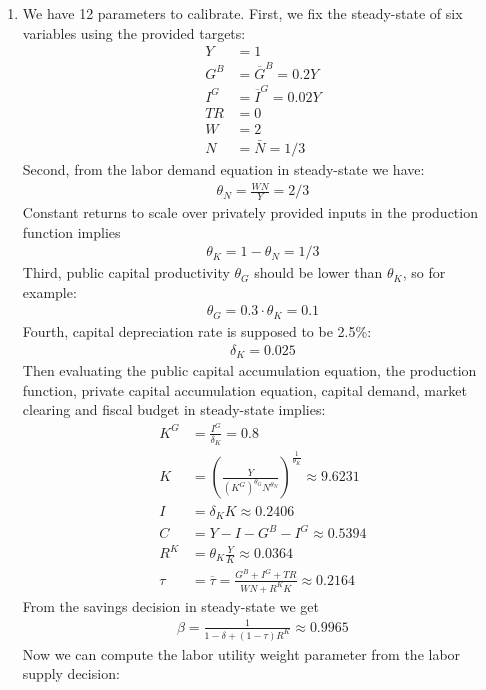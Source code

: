 \begin{enumerate}
\item
We have 12 parameters to calibrate.
First, we fix the steady-state of six variables using the provided targets:
\begin{align*}
Y &= 1
\\
G^B &= \overline{G}^B = 0.2 Y \tag*{(*)}
\\
I^G &= \overline{I}^G = 0.02 Y \tag*{(*)}
\\
{TR} &= 0
\\
W &= 2
\\
N &= \bar{N} = 1/3
\end{align*}
Second, from the labor demand equation in steady-state we have:
\begin{align*}
\theta_N = \frac{W N}{Y} = 2/3 \tag*{(*)}
\end{align*}
Constant returns to scale over privately provided inputs in the production function implies
\begin{align*}
\theta_K = 1-\theta_N = 1/3 \tag*{(*)}
\end{align*}
Third, public capital productivity \(\theta_G\) should be lower than \(\theta_K\), so for example:
\begin{align*}
\theta_G = 0.3 \cdot \theta_K = 0.1 \tag*{(*)}
\end{align*}
Fourth, capital depreciation rate is supposed to be 2.5\%:
\begin{align*}
\delta_K = 0.025 \tag*{(*)}
\end{align*}
Then evaluating the public capital accumulation equation, the production function,
  private capital accumulation equation, capital demand, market clearing and fiscal budget in steady-state implies:
\begin{align*}
K^G &= \frac{I^G}{\delta_K} = 0.8
\\
K &= {\left(\frac{Y}{{(K^G)}^{\theta_G} N^{\theta_N}}\right)}^{\frac{1}{\theta_K}} \approx 9.6231
\\
I &= \delta_K K \approx 0.2406
\\
C &= Y - I - G^B - I^G \approx 0.5394
\\
R^K &= \theta_K \frac{Y}{K} \approx 0.0364
\\
\tau &= \overline{\tau} = \frac{G^B + I^G + {TR}}{W N + R^K K} \approx 0.2164 \tag*{(*)}
\end{align*}
From the savings decision in steady-state we get
\begin{align*}
\beta = \frac{1}{1-\delta + (1-\tau)R^K} \approx 0.9965 \tag*{(*)}
\end{align*}
Now we can compute the labor utility weight parameter from the labor supply decision:

\end{enumerate}
